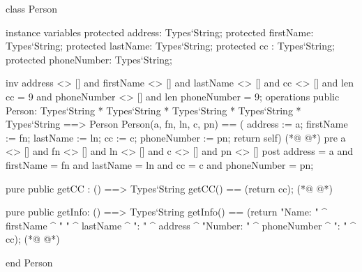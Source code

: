 \begin{vdmpp}[breaklines=true]
class Person

instance variables
  protected address: Types`String;
  protected firstName: Types`String;
  protected lastName: Types`String;
  protected cc : Types`String;
  protected phoneNumber: Types`String;
 
  inv address <> [] and firstName <> [] and lastName <> [] and cc <> [] and len cc = 9 and phoneNumber <> [] and len phoneNumber = 9;
operations
 public Person: Types`String * Types`String * Types`String * Types`String * Types`String ==> Person
  Person(a, fn, ln, c, pn) == ( address := a; firstName := fn; lastName := ln; cc := c; phoneNumber := pn; return self)
(*@
\label{Person:14}
@*)
 pre a <> [] and fn <> [] and ln <> [] and c <> [] and pn <> []
 post address = a and firstName = fn and lastName = ln and cc = c and phoneNumber = pn;
  
 pure public getCC : () ==> Types`String
  getCC() == (return cc);
(*@
\label{getCC:19}
@*)
  
 pure public getInfo: () ==> Types`String
  getInfo() == (return "Name: " ^ firstName ^ " " ^ lastName ^ "\nAddress: " ^ address ^ "\nPhone Number: " ^ phoneNumber ^ "\nCC: " ^ cc);
(*@
\label{getInfo:22}
@*)

end Person
\end{vdmpp}
